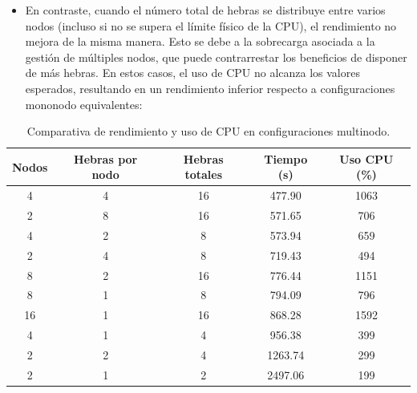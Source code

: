 \begin{itemize}
    \item En contraste, cuando el número total de hebras se distribuye entre varios nodos (incluso si no se supera el límite físico de la CPU), el rendimiento no mejora de la misma manera. Esto se debe a la sobrecarga asociada a la gestión de múltiples nodos, que puede contrarrestar los beneficios de disponer de más hebras. En estos casos, el uso de CPU no alcanza los valores esperados, resultando en un rendimiento inferior respecto a configuraciones mononodo equivalentes:
\end{itemize}

\begin{table}[ht]
    \centering
    \begin{tabular}{|c|c|c|c|c|}
        \hline
        \textbf{Nodos} & \textbf{Hebras por nodo} & \textbf{Hebras totales} & \textbf{Tiempo (s)} & \textbf{Uso CPU (\%)} \\
        \hline
        4              & 4                        & 16                      & 477.90              & 1063                  \\
        2              & 8                        & 16                      & 571.65              & 706                   \\
        4              & 2                        & 8                       & 573.94              & 659                   \\
        2              & 4                        & 8                       & 719.43              & 494                   \\
        8              & 2                        & 16                      & 776.44              & 1151                  \\
        8              & 1                        & 8                       & 794.09              & 796                   \\
        16             & 1                        & 16                      & 868.28              & 1592                  \\
        4              & 1                        & 4                       & 956.38              & 399                   \\
        2              & 2                        & 4                       & 1263.74             & 299                   \\
        2              & 1                        & 2                       & 2497.06             & 199                   \\
        \hline
    \end{tabular}
    \caption{Comparativa de rendimiento y uso de CPU en configuraciones multinodo.}
\end{table}

